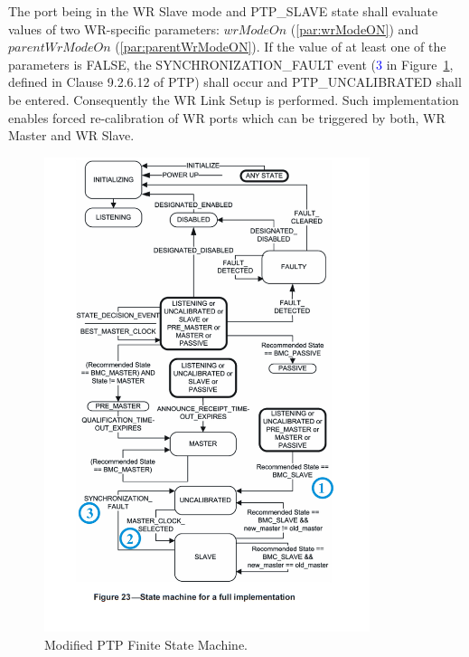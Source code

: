 \documentclass[a4paper, 12pt]{article}
\begin{document}
The port being in the WR Slave mode and PTP\_SLAVE state shall evaluate values of two WR-specific 
parameters: $wrModeOn$ (\ref{par:wrModeON}) and $parentWrModeOn$ (\ref{par:parentWrModeON}). 
If the value of at least one of the parameters is FALSE, the SYNCHRONIZATION\_FAULT event 
(\textcolor{blue}{3} in Figure~\ref{fig:modifiedPtpFSM}, defined in Clause 9.2.6.12 of PTP) shall 
occur and PTP\_UNCALIBRATED shall be entered. Consequently the WR Link Setup is performed. 
Such implementation enables forced re-calibration of WR ports which can be triggered by both, 
WR Master and WR Slave.

 

% 

\newpage

\begin{figure}[ht!]
  \centering
  \includegraphics[width=0.85\textwidth]{protocol/modifiedPtpFSM.pdf}
  \caption{Modified PTP Finite State Machine.}
  \label{fig:modifiedPtpFSM}
\end{figure}
\end{document}
